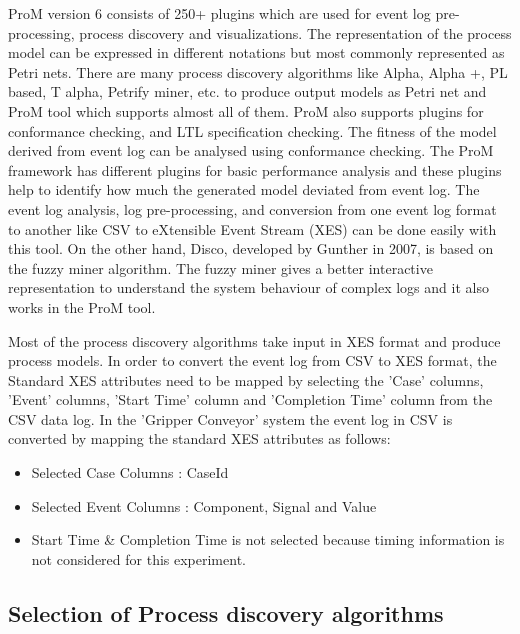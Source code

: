 \begin{bibunit}
   
   ProM version 6 consists of 250+ plugins which are used for event log pre-processing, process discovery and visualizations. The representation of the process model can be expressed in different notations but most commonly represented as Petri nets. There are many process discovery algorithms \cite{van2009process} like Alpha, Alpha +, PL based, T alpha, Petrify miner, etc. to produce output models as Petri net and ProM tool which supports almost all of them. ProM also supports plugins for conformance checking, and LTL specification checking. The fitness of the model derived from event log can be analysed using conformance checking. The ProM framework has different plugins for basic performance analysis and these plugins help to identify how much the generated model deviated from event log. The event log analysis, log pre-processing, and conversion from one event log format to another like CSV to eXtensible Event Stream (XES) can be done easily with this tool. On the other hand, Disco, developed by Gunther in 2007, is based on the fuzzy miner algorithm.  The fuzzy miner gives a better interactive representation to understand the system behaviour of complex logs and it also works in the ProM tool.
   
   Most of the process discovery algorithms take input in XES format and produce process models. In order to convert the event log from CSV to XES format, the Standard XES attributes need to be mapped by selecting the ’Case’ columns, ’Event’ columns, ’Start Time’ column and ’Completion Time’ column from the CSV data log. In the ’Gripper Conveyor’ system the event log in CSV is converted by mapping the standard XES attributes as follows:
   
   
   \begin{itemize}
	 \item Selected Case Columns : CaseId
	 \item Selected Event Columns : Component, Signal and Value
	 \item Start Time \& Completion Time is not selected because timing information is not considered for this experiment.
   \end{itemize}
   
   \subsection{Selection of Process discovery algorithms }
   

\end{bibunit}
